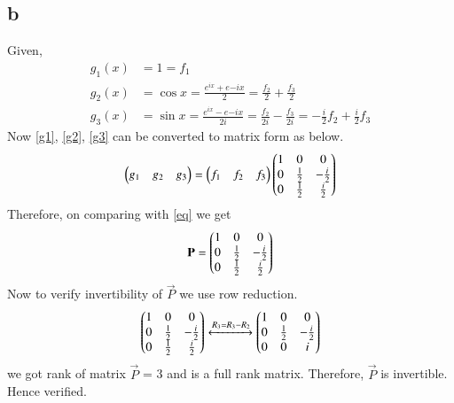 \documentclass[journal,12pt,twocolumn]{IEEEtran}
\begin{document}
\subsection{b}
Given,
\begin{align}
    g_1(x)&=1=f_1\label{g1}\\
    g_2(x)&=\cos{x}=\frac{e^{ix}+e{-ix}}{2}=\frac{f_2}{2}+\frac{f_3}{2}\label{g2}\\
    g_3(x)&=\sin{x}=\frac{e^{ix}-e{-ix}}{2i}=\frac{f_2}{2i}-\frac{f_3}{2i}=-\frac{i}{2}f_2+\frac{i}{2}f_3\label{g3}
\end{align}
Now \eqref{g1}, \eqref{g2}, \eqref{g3} can be converted to matrix form as below.
\begin{align}
    \begin{pmatrix}g_1&g_2&g_3\end{pmatrix}=\begin{pmatrix}f_1&f_2&f_3\end{pmatrix}\begin{pmatrix}1&0&0\\0&\frac{1}{2}&-\frac{i}{2}\\0&\frac{1}{2}&\frac{i}{2}\end{pmatrix}
\end{align}
Therefore, on comparing with \eqref{eq} we get
\begin{align}
    \mathbf{P}=\begin{pmatrix}1&0&0\\0&\frac{1}{2}&-\frac{i}{2}\\0&\frac{1}{2}&\frac{i}{2}\end{pmatrix}
\end{align}
Now to verify invertibility  of $\Vec{P}$ we use row reduction.
\begin{align}
    \begin{pmatrix}1&0&0\\0&\frac{1}{2}&-\frac{i}{2}\\0&\frac{1}{2}&\frac{i}{2}\end{pmatrix}\xleftrightarrow{R_3=R_3-R_2}\begin{pmatrix}1&0&0\\0&\frac{1}{2}&-\frac{i}{2}\\0&0&i\end{pmatrix}
\end{align}
we got rank of matrix $\vec{P}$ = 3 and is a full rank matrix. Therefore, $\vec{P}$ is invertible.
Hence verified.\\\\



 
\end{document}
